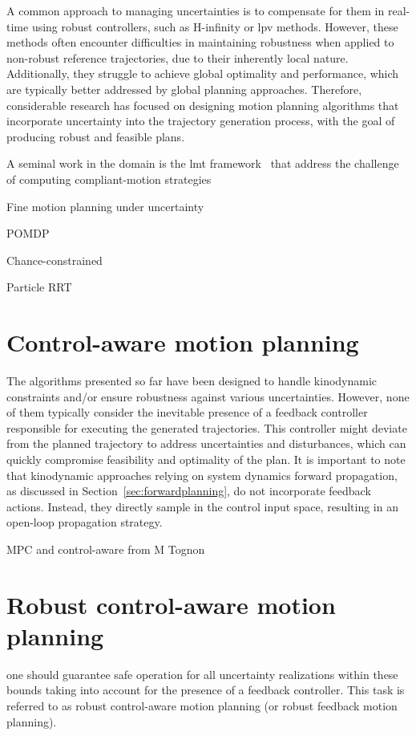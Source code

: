A common approach to managing uncertainties is to compensate for them in real-time using robust controllers, such as H-infinity or \gls{lpv} methods.
However, these methods often encounter difficulties in maintaining robustness when applied to non-robust reference trajectories, due to their inherently local nature.
Additionally, they struggle to achieve global optimality and performance, which are typically better addressed by global planning approaches.
Therefore, considerable research has focused on designing motion planning algorithms that incorporate uncertainty into the trajectory generation process, with the goal of producing robust and feasible plans.

A seminal work in the domain is the \gls{lmt} framework~\cite{cLMT} that address the challenge of computing compliant-motion strategies

{Fine motion planning under uncertainty}

{POMDP}

{Chance-constrained}

{Particle RRT}



\section{Control-aware motion planning}

The algorithms presented so far have been designed to handle kinodynamic constraints and/or ensure robustness against various uncertainties.
However, none of them typically consider the inevitable presence of a feedback controller responsible for executing the generated trajectories. 
This controller might deviate from the planned trajectory to address uncertainties and disturbances, which can quickly compromise feasibility and optimality of the plan.
It is important to note that kinodynamic approaches relying on system dynamics forward propagation, as discussed in Section~\ref{sec:forwardplanning}, do not incorporate feedback actions.
Instead, they directly sample in the control input space, resulting in an open-loop propagation strategy.

MPC and control-aware from M Tognon

\section{Robust control-aware motion planning}

one should guarantee safe operation for all uncertainty realizations within these bounds taking into account for the presence of a feedback controller. This task is referred to as robust control-aware motion planning (or robust feedback motion planning).

